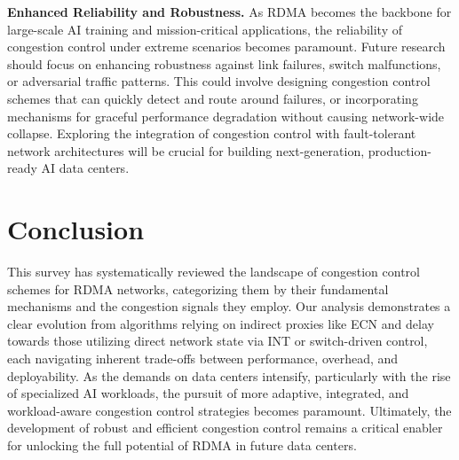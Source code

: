 \documentclass[11pt,en]{elegantpaper}
\begin{document}
\textbf{Enhanced Reliability and Robustness.} As RDMA becomes the backbone for large-scale AI training and mission-critical applications, the reliability of congestion control under extreme scenarios becomes paramount. Future research should focus on enhancing robustness against link failures, switch malfunctions, or adversarial traffic patterns. This could involve designing congestion control schemes that can quickly detect and route around failures, or incorporating mechanisms for graceful performance degradation without causing network-wide collapse. Exploring the integration of congestion control with fault-tolerant network architectures will be crucial for building next-generation, production-ready AI data centers.


\section{Conclusion}
\label{sec:conclusion}

This survey has systematically reviewed the landscape of congestion control schemes for RDMA networks, categorizing them by their fundamental mechanisms and the congestion signals they employ. Our analysis demonstrates a clear evolution from algorithms relying on indirect proxies like ECN and delay towards those utilizing direct network state via INT or switch-driven control, each navigating inherent trade-offs between performance, overhead, and deployability. As the demands on data centers intensify, particularly with the rise of specialized AI workloads, the pursuit of more adaptive, integrated, and workload-aware congestion control strategies becomes paramount. Ultimately, the development of robust and efficient congestion control remains a critical enabler for unlocking the full potential of RDMA in future data centers.


\printbibliography[heading=bibintoc, title=\ebibname]
\end{document}
